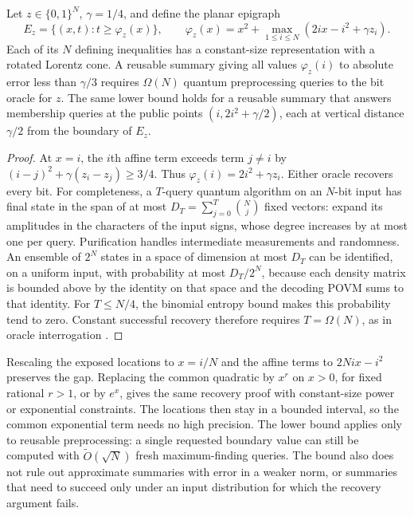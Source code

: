 \begin{proposition}\label{prop:projected-reusable}
Let $z\in\{0,1\}^N$, $\gamma=1/4$, and define the planar epigraph
\begin{equation}\label{eq:projected-exposed-arcs}
 E_z=\{(x,t):t\geq\varphi_z(x)\},\qquad
 \varphi_z(x)=x^2+\max_{1\leq i\leq N}
                       (2ix-i^2+\gamma z_i).
\end{equation}
Each of its $N$ defining inequalities has a constant-size
representation with a rotated Lorentz cone.
A reusable summary giving all values $\varphi_z(i)$ to absolute error
less than $\gamma/3$ requires $\Omega(N)$ quantum preprocessing queries
to the bit oracle for $z$.
The same lower bound holds for a reusable summary that answers membership
queries at the public points $(i,2i^2+\gamma/2)$, each at vertical
distance $\gamma/2$ from the boundary of $E_z$.
\end{proposition}
\begin{proof}
At $x=i$, the $i$th affine term exceeds term $j\ne i$ by
$(i-j)^2+\gamma(z_i-z_j)\geq3/4$.  Thus
$\varphi_z(i)=2i^2+\gamma z_i$.  Either oracle recovers every bit.
For completeness, a $T$-query quantum algorithm on an $N$-bit input has
final state in the span of at most $D_T=\sum_{j=0}^T\binom Nj$ fixed
vectors: expand its amplitudes in the characters of the input signs,
whose degree increases by at most one per query.  Purification handles
intermediate measurements and randomness.  An ensemble of $2^N$ states
in a space of dimension at most $D_T$ can be identified, on a uniform
input, with probability at most $D_T/2^N$, because each density matrix is
bounded above by the identity on that space and the decoding POVM sums
to that identity.  For $T\leq N/4$, the binomial entropy bound makes
this probability tend to zero.  Constant successful recovery therefore
requires $T=\Omega(N)$, as in oracle interrogation
\citep{vanDam1998}.
\end{proof}

Rescaling the exposed locations to $x=i/N$ and the affine terms to
$2Ni x-i^2$ preserves the gap.  Replacing the common quadratic by
$x^r$ on $x>0$, for fixed rational $r>1$, or by $e^x$, gives the same
recovery proof with constant-size power or exponential constraints.
The locations then stay in a bounded interval, so the common exponential
term needs no high precision.  The lower bound applies only to reusable
preprocessing: a single requested boundary value can still be computed
with $\widetilde O(\sqrt N)$ fresh maximum-finding queries.  The bound
also does not rule out approximate summaries with error in a weaker
norm, or summaries that need to succeed only under an input distribution
for which the recovery argument fails.

